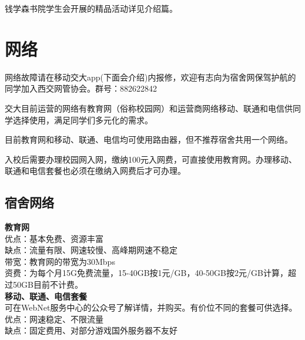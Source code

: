 \documentclass[
decoration,  %
]{qyxf-book}
\begin{document}
钱学森书院学生会开展的精品活动详见介绍篇。

\section{网络}
网络故障请在移动交大app(下面会介绍)内报修，欢迎有志向为宿舍网保驾护航的同学加入西交网管协会。群号：882622842

交大目前运营的网络有教育网（俗称校园网）和运营商网络移动、联通和电信供同学选择使用，满足同学们多元化的需求。

目前教育网和移动、联通、电信均可使用路由器，但不推荐宿舍共用一个网络。

入校后需要办理校园网入网，缴纳100元入网费，可直接使用教育网。办理移动、联通和电信套餐也必须在缴纳入网费后才可办理。


\subsection{宿舍网络}
\noindent \textbf{教育网}\\
优点：基本免费、资源丰富\\
缺点：流量有限、网速较慢、高峰期网速不稳定\\
带宽：教育网的带宽为30Mbps\\
资费：为每个月15G免费流量，15-40GB按1元/GB，40-50GB按2元/GB计算，超过50GB目前不计费。\\
\textbf{移动、联通、电信套餐}\\
可在WebNet服务中心的公众号了解详情，并购买。有价位不同的套餐可供选择。
优点：网速稳定、不限流量\\
缺点：固定费用、对部分游戏国外服务器不友好
\end{document}
